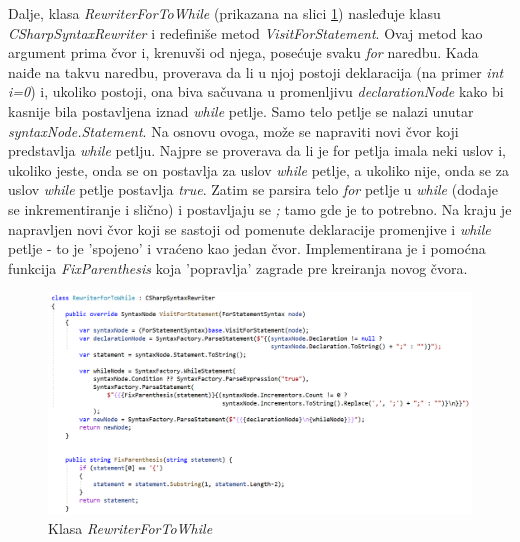 \documentclass[a4paper]{article}
\begin{document}
{		
		Dalje, klasa \textit{RewriterForToWhile} (prikazana na slici \ref{fig:RewriterForToWhile}) nasleđuje klasu \textit{CSharpSyntaxRewriter} i redefiniše metod \textit{VisitForStatement}. Ovaj metod kao argument prima čvor i, krenuvši od njega, posećuje svaku \textit{for} naredbu. Kada naiđe na takvu naredbu, proverava da li u njoj postoji deklaracija (na primer \textit{int i=0}) i, ukoliko postoji, ona biva sačuvana u promenljivu \textit{declarationNode} kako bi kasnije bila postavljena iznad \textit{while} petlje. Samo telo petlje se nalazi unutar \textit{syntaxNode.Statement}. Na osnovu ovoga, može se napraviti novi čvor koji predstavlja \textit{while} petlju. Najpre se proverava da li je for petlja imala neki uslov i, ukoliko jeste, onda se on postavlja za uslov \textit{while} petlje, a ukoliko nije, onda se za uslov \textit{while} petlje postavlja \textit{true}. Zatim se parsira telo \textit{for} petlje u \textit{while} (dodaje se inkrementiranje i slično) i postavljaju se \textit{;} tamo gde je to potrebno. Na kraju je napravljen novi čvor koji se sastoji od pomenute deklaracije promenjive i \textit{while} petlje - to je 'spojeno' i vraćeno kao jedan čvor. Implementirana je i pomoćna funkcija \textit{FixParenthesis} koja 'popravlja' zagrade pre kreiranja novog čvora.
		
		\FloatBarrier
		\begin{figure}[!htb]
			\begin{center}
				\includegraphics[scale=0.44]{images/RewriterForToWhile.png}
			\end{center}
			\caption{Klasa \textit{RewriterForToWhile}}
			\label{fig:RewriterForToWhile}
		\end{figure}
		\FloatBarrier
		
}
\end{document}
